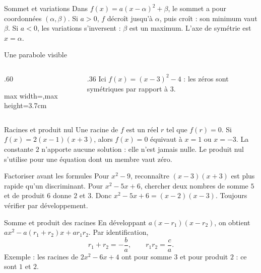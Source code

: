 \documentclass[aspectratio=169,12pt]{beamer}
\begin{document}
\renewcommand{\slidekind}{COMPRENDRE}
\begin{frame}[t,fragile]{Sommet et variations}
Dans $f(x)=a(x-\alpha)^2+\beta$, le sommet a pour coordonnées $(\alpha,\beta)$. Si $a>0$, $f$ décroît jusqu’à $\alpha$, puis croît : son minimum vaut $\beta$. Si $a<0$, les variations s’inversent : $\beta$ est un maximum. L’axe de symétrie est $x=\alpha$.
\end{frame}
\renewcommand{\slidekind}{COMPRENDRE}
\begin{frame}[t,fragile]{Une parabole visible}
\begin{columns}[c,onlytextwidth]\begin{column}{.60\textwidth}\centering\begin{adjustbox}{max width=\linewidth,max height=3.7cm}\end{adjustbox}\end{column}\begin{column}{.36\textwidth} Ici $f(x)=(x-3)^2-4$ : les zéros sont symétriques par rapport à $3$.\end{column}\end{columns}
\end{frame}
\renewcommand{\slidekind}{COMPRENDRE}
\begin{frame}[t,fragile]{Racines et produit nul}
Une racine de $f$ est un réel $r$ tel que $f(r)=0$. Si $f(x)=2(x-1)(x+3)$, alors $f(x)=0$ équivaut à $x=1$ ou $x=-3$. La constante $2$ n’apporte aucune solution : elle n’est jamais nulle. Le produit nul s’utilise pour une équation dont un membre vaut zéro.
\end{frame}
\renewcommand{\slidekind}{COMPRENDRE}
\begin{frame}[t,fragile]{Factoriser avant les formules}
Pour $x^2-9$, reconnaître $(x-3)(x+3)$ est plus rapide qu’un discriminant. Pour $x^2-5x+6$, chercher deux nombres de somme $5$ et de produit $6$ donne $2$ et $3$. Donc $x^2-5x+6=(x-2)(x-3)$. Toujours vérifier par développement.
\end{frame}
\renewcommand{\slidekind}{COMPRENDRE}
\begin{frame}[t,fragile]{Somme et produit des racines}
En développant $a(x-r_1)(x-r_2)$, on obtient $ax^2-a(r_1+r_2)x+ar_1r_2$. Par identification, \[r_1+r_2=-\frac ba,\qquad r_1r_2=\frac ca.\] Exemple : les racines de $2x^2-6x+4$ ont pour somme $3$ et pour produit $2$ : ce sont $1$ et $2$.
\end{frame}
\end{document}
